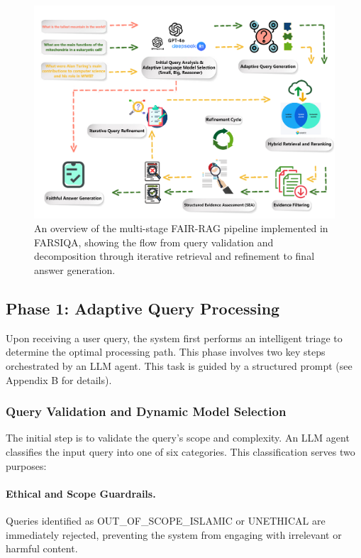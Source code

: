 \documentclass[11pt]{article}
\begin{document}
\begin{figure}[t]
\centering
\includegraphics[width=\textwidth]{figure_1.png}
\caption{An overview of the multi-stage FAIR-RAG pipeline implemented in FARSIQA, showing the flow from query validation and decomposition through iterative retrieval and refinement to final answer generation.}
\label{fig:fair-rag-pipeline}
\end{figure}

\subsection{Phase 1: Adaptive Query Processing}

Upon receiving a user query, the system first performs an intelligent triage to determine the optimal processing path. This phase involves two key steps orchestrated by an LLM agent. \cite{fairrag} This task is guided by a structured prompt (see Appendix B for details).

\subsubsection{Query Validation and Dynamic Model Selection}

The initial step is to validate the query's scope and complexity. An LLM agent classifies the input query into one of six categories. This classification serves two purposes:

\paragraph{Ethical and Scope Guardrails.}
Queries identified as OUT\_OF\_SCOPE\_ISLAMIC or UNETHICAL are immediately rejected, preventing the system from engaging with irrelevant or harmful content.
\end{document}
